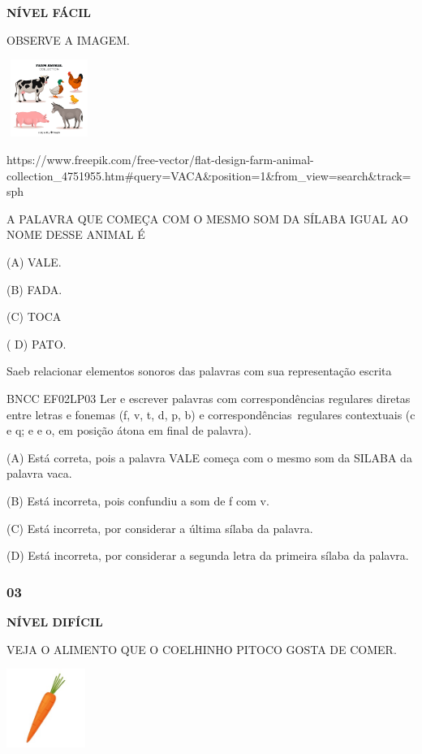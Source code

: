 \textbf{NÍVEL FÁCIL}

OBSERVE A IMAGEM.

\includegraphics[width=1.10000in,height=0.99236in]{media/image148.jpeg}

https://www.freepik.com/free-vector/flat-design-farm-animal-collection\_4751955.htm\#query=VACA\&position=1\&from\_view=search\&track=sph

\protect\hypertarget{_Hlk129501578}{}{}A PALAVRA QUE COMEÇA COM O MESMO
SOM DA SÍLABA IGUAL AO NOME DESSE ANIMAL É

(A) VALE.

(B) FADA.

(C) TOCA

( D) PATO.

Saeb relacionar elementos sonoros das palavras com sua representação
escrita

BNCC EF02LP03 Ler e escrever palavras com correspondências regulares
diretas entre letras e fonemas (f, v, t, d, p, b) e
correspondências~regulares contextuais (c e q; e e o, em posição átona
em final de palavra).

\protect\hypertarget{_Hlk129501896}{}{}(A)
\protect\hypertarget{_Hlk129289891}{}{}Está correta, pois a palavra VALE
começa com o mesmo som da SILABA da palavra vaca.

(B) Está incorreta, pois confundiu a som de f com v.

(C) Está incorreta, por considerar a última sílaba da palavra.

(D) Está incorreta, por considerar a segunda letra da primeira sílaba da
palavra.

\subsubsection{03}\label{section-113}

\textbf{NÍVEL DIFÍCIL}

VEJA O ALIMENTO QUE O COELHINHO PITOCO GOSTA DE COMER.

\includegraphics[width=1.01111in,height=1.01111in]{media/image149.jpeg}

